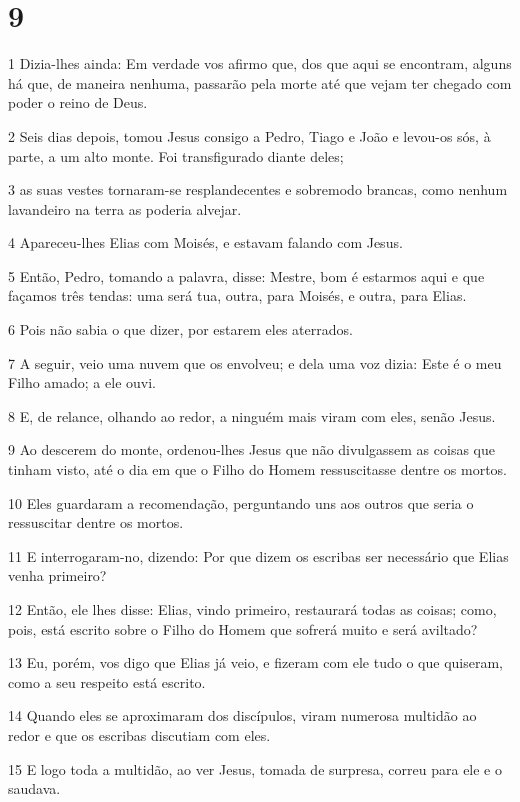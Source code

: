 \chapter{9}

\par 1 Dizia-lhes ainda: Em verdade vos afirmo que, dos que aqui se encontram, alguns há que, de maneira nenhuma, passarão pela morte até que vejam ter chegado com poder o reino de Deus.
\par 2 Seis dias depois, tomou Jesus consigo a Pedro, Tiago e João e levou-os sós, à parte, a um alto monte. Foi transfigurado diante deles;
\par 3 as suas vestes tornaram-se resplandecentes e sobremodo brancas, como nenhum lavandeiro na terra as poderia alvejar.
\par 4 Apareceu-lhes Elias com Moisés, e estavam falando com Jesus.
\par 5 Então, Pedro, tomando a palavra, disse: Mestre, bom é estarmos aqui e que façamos três tendas: uma será tua, outra, para Moisés, e outra, para Elias.
\par 6 Pois não sabia o que dizer, por estarem eles aterrados.
\par 7 A seguir, veio uma nuvem que os envolveu; e dela uma voz dizia: Este é o meu Filho amado; a ele ouvi.
\par 8 E, de relance, olhando ao redor, a ninguém mais viram com eles, senão Jesus.
\par 9 Ao descerem do monte, ordenou-lhes Jesus que não divulgassem as coisas que tinham visto, até o dia em que o Filho do Homem ressuscitasse dentre os mortos.
\par 10 Eles guardaram a recomendação, perguntando uns aos outros que seria o ressuscitar dentre os mortos.
\par 11 E interrogaram-no, dizendo: Por que dizem os escribas ser necessário que Elias venha primeiro?
\par 12 Então, ele lhes disse: Elias, vindo primeiro, restaurará todas as coisas; como, pois, está escrito sobre o Filho do Homem que sofrerá muito e será aviltado?
\par 13 Eu, porém, vos digo que Elias já veio, e fizeram com ele tudo o que quiseram, como a seu respeito está escrito.
\par 14 Quando eles se aproximaram dos discípulos, viram numerosa multidão ao redor e que os escribas discutiam com eles.
\par 15 E logo toda a multidão, ao ver Jesus, tomada de surpresa, correu para ele e o saudava.
